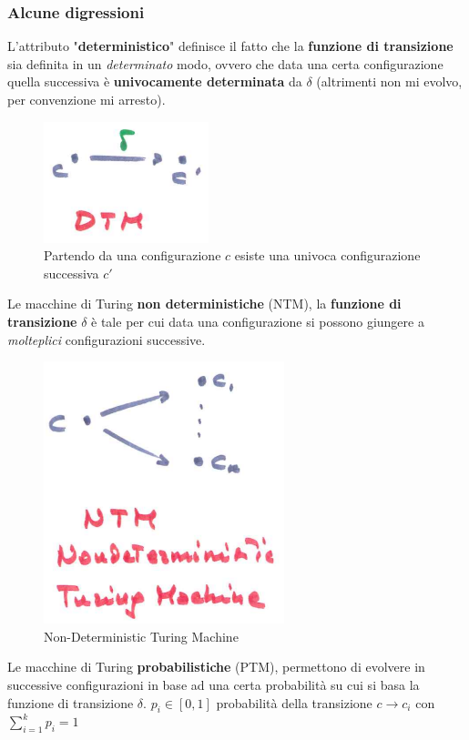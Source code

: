 \documentclass{article}
\begin{document}
\subsubsection{Alcune digressioni}
L'attributo "\textbf{deterministico}" definisce il fatto che la \textbf{funzione di transizione}
sia definita in un \textit{determinato} modo, ovvero che data una certa configurazione quella successiva è
\textbf{univocamente determinata} da $\delta$ (altrimenti non mi evolvo, per convenzione mi arresto).
\begin{figure}[H]
    \centering
    \includegraphics[scale=0.6]{images/dtm_def.png}
    \caption{Partendo da una configurazione $c$ esiste una univoca configurazione
        successiva $c'$}
\end{figure}
Le macchine di Turing \textbf{non deterministiche} (NTM), la \textbf{funzione di transizione}
$\delta$ è tale per cui data una configurazione si possono giungere a \textit{molteplici} configurazioni
successive.
\begin{figure}[H]
    \centering
    \includegraphics[scale=0.6]{images/NTM.png}
    \caption{Non-Deterministic Turing Machine}
\end{figure}
Le macchine di Turing \textbf{probabilistiche} (PTM), permettono di evolvere
in successive configurazioni in base ad una certa probabilità su cui si basa la funzione
di transizione $\delta$.
$p_i\in[0,1]$ probabilità della transizione $c\rightarrow c_i$ con $\sum_{i=1}^k p_i=1$
\end{document}
